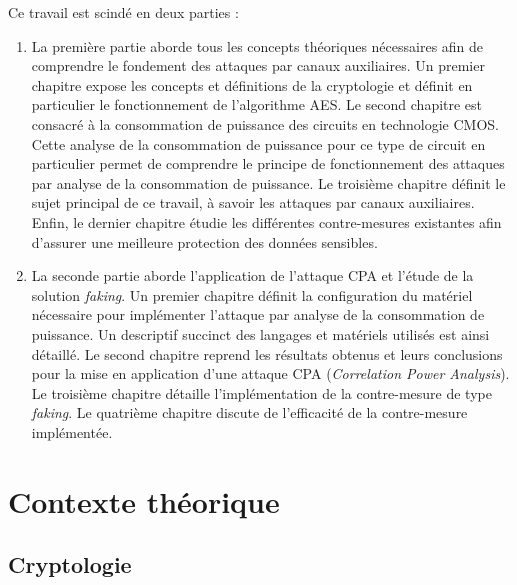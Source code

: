 \documentclass[oneside]{book}
\begin{document}
\hspace{-0.5cm}Ce travail est scindé en deux parties : 
\begin{enumerate}
\item La première partie aborde tous les concepts théoriques nécessaires afin de comprendre le fondement des attaques par canaux auxiliaires. Un premier chapitre expose les concepts et définitions de la cryptologie et définit en particulier le fonctionnement de l'algorithme AES. Le second chapitre est consacré à la consommation de puissance des circuits en technologie CMOS. Cette analyse de la consommation de puissance pour ce type de circuit en particulier permet de comprendre le principe de fonctionnement des attaques par analyse de la consommation de puissance. Le troisième chapitre définit le sujet principal de ce travail, à savoir les attaques par canaux auxiliaires. Enfin, le dernier chapitre étudie les différentes contre-mesures existantes afin d'assurer une meilleure protection des données sensibles. 
\item La seconde partie aborde l'application de l'attaque CPA et l'étude de la solution \textit{faking}. Un premier chapitre définit la configuration du matériel nécessaire pour implémenter l'attaque par analyse de la consommation de puissance. Un descriptif succinct des langages et matériels utilisés est ainsi détaillé. Le second chapitre reprend les résultats obtenus et leurs conclusions pour la mise en application d'une attaque CPA (\textit{Correlation Power Analysis}). Le troisième chapitre détaille l'implémentation de la contre-mesure de type \textit{faking}. Le quatrième chapitre discute de l'efficacité de la contre-mesure implémentée.
\end{enumerate}


\newpage


\part{Contexte théorique}


\chapter{Cryptologie}
\label{chap:crypto}
\end{document}
